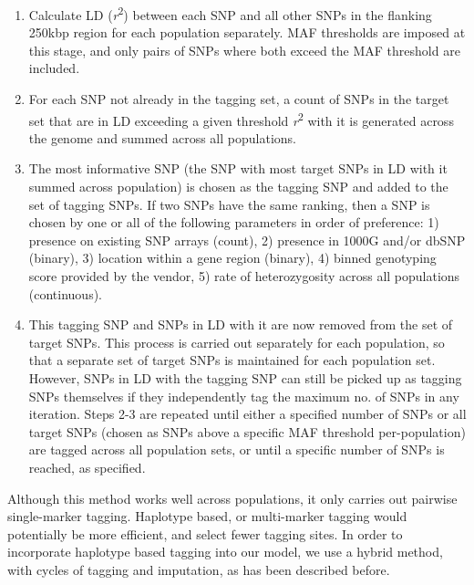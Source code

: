 \begin{enumerate}
\item Calculate \gls{LD} (\textit{r}\textsuperscript{2}) between each \gls{SNP} and all other \glspl{SNP} in the flanking 250kbp region for each population separately. \gls{MAF} thresholds are imposed at this stage, and only pairs of \glspl{SNP} where both exceed the \gls{MAF} threshold are included.
\item For each \gls{SNP} not already in the tagging set, a count of \glspl{SNP} in the target set that are in \gls{LD} exceeding a given threshold \textit{r}\textsuperscript{2} with it is generated across the genome and summed across all populations.
\item The most informative \gls{SNP} (the \gls{SNP} with most target \glspl{SNP} in \gls{LD} with it summed across population) is chosen as the tagging \gls{SNP} and added to the set of tagging \glspl{SNP}. If two \glspl{SNP} have the same ranking, then a \gls{SNP} is chosen by one or all of the following parameters in order of preference: 1) presence on existing SNP arrays (count), 2) presence in 1000G and/or dbSNP (binary), 3) location within a gene region (binary), 4) binned genotyping score provided by the vendor, 5) rate of heterozygosity across all populations (continuous).
\item This tagging SNP and SNPs in LD with it are now removed from the set of target SNPs. This process is carried out separately for each population, so that a separate set of target SNPs is maintained for each population set. However, SNPs in LD with the tagging SNP can still be picked up as tagging SNPs themselves if they independently tag the maximum no. of SNPs in any iteration.
Steps 2-3 are repeated until either a specified number of SNPs or all target SNPs (chosen as SNPs above a specific MAF threshold per-population) are tagged across all population sets, or until a specific number of SNPs is reached, as specified.
\end{enumerate}

Although this method works well across populations, it only carries out pairwise single-marker tagging. Haplotype based, or multi-marker tagging would potentially be more efficient, and select fewer tagging sites. In order to incorporate haplotype based tagging into our model, we use a hybrid method, with cycles of tagging and imputation, as has been described before.\cite{Hoffmann2011422}

